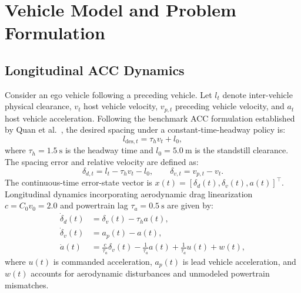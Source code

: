 \documentclass[journal]{IEEEtran}
\begin{document}
\section{Vehicle Model and Problem Formulation}

\subsection{Longitudinal ACC Dynamics}

Consider an ego vehicle following a preceding vehicle. Let $l_t$ denote inter-vehicle physical clearance, $v_t$ host vehicle velocity, $v_{p,t}$ preceding vehicle velocity, and $a_t$ host vehicle acceleration. Following the benchmark ACC formulation established by Quan et al.~\cite{Quan2024}, the desired spacing under a constant-time-headway policy is:
\begin{equation}
l_{\mathrm{des},t} = \tau_h v_t + l_0,
\end{equation}
where $\tau_h = 1.5~\text{s}$ is the headway time and $l_0 = 5.0~\text{m}$ is the standstill clearance. The spacing error and relative velocity are defined as:
\begin{equation}
\delta_{d,t} = l_t - \tau_h v_t - l_0, \qquad \delta_{v,t} = v_{p,t} - v_t.
\end{equation}
The continuous-time error-state vector is $x(t) = [\delta_d(t), \delta_v(t), a(t)]^\top$. Longitudinal dynamics incorporating aerodynamic drag linearization $c = C_0 v_0 = 2.0$ and powertrain lag $\tau_a = 0.5~\text{s}$ are given by:
\begin{align}
\dot\delta_d(t) &= \delta_v(t) - \tau_h a(t), \label{eq:cont_dyn1} \\
\dot\delta_v(t) &= a_p(t) - a(t), \label{eq:cont_dyn2} \\
\dot a(t) &= \frac{c}{\tau_a}\delta_v(t) -\frac{1}{\tau_a} a(t) + \frac{1}{\tau_a} u(t) + w(t), \label{eq:cont_dyn3}
\end{align}
where $u(t)$ is commanded acceleration, $a_p(t)$ is lead vehicle acceleration, and $w(t)$ accounts for aerodynamic disturbances and unmodeled powertrain mismatches.
\end{document}
